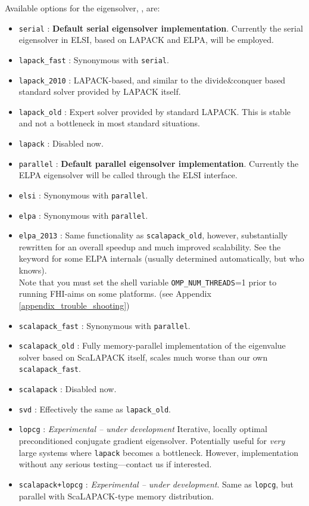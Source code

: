 Available options for the eigensolver, , are:
\begin{itemize}
  \item \texttt{serial} : \textbf{Default serial eigensolver implementation}.
    Currently the serial eigensolver in ELSI, based on LAPACK and ELPA, will be
    employed.
  \item \texttt{lapack\_fast} : Synonymous with \texttt{serial}.
  \item \texttt{lapack\_2010} : LAPACK-based, and similar to the divide\&conquer
    based standard solver provided by LAPACK itself.
  \item \texttt{lapack\_old} : Expert solver provided by standard LAPACK. This
    is stable and not a bottleneck in most standard situations.
  \item \texttt{lapack} : Disabled now.
  \item \texttt{parallel} : \textbf{Default parallel eigensolver
    implementation}. Currently the ELPA eigensolver will be called through the
    ELSI interface.
  \item \texttt{elsi} : Synonymous with \texttt{parallel}.
  \item \texttt{elpa} : Synonymous with \texttt{parallel}.
  \item \texttt{elpa\_2013} : Same functionality as \texttt{scalapack\_old},
    however, substantially rewritten for an overall speedup and much improved
    scalability. See the  keyword for some ELPA
    internals (usually determined automatically, but who knows). \\
    Note that you must set the shell variable \texttt{OMP\_NUM\_THREADS}=1
    prior to running FHI-aims on some platforms. (see Appendix
    \ref{appendix_trouble_shooting})
  \item \texttt{scalapack\_fast} : Synonymous with \texttt{parallel}.
  \item \texttt{scalapack\_old} : Fully memory-parallel implementation of the
    eigenvalue solver based on ScaLAPACK itself, scales much worse than our own
    \texttt{scalapack\_fast}.
  \item \texttt{scalapack} : Disabled now.
  \item \texttt{svd} : Effectively the same as \texttt{lapack\_old}.
  \item \texttt{lopcg} : \emph{Experimental -- under development} Iterative,
    locally optimal preconditioned conjugate gradient eigensolver. Potentially
    useful for \emph{very} large systems where \texttt{lapack} becomes a
    bottleneck. However, implementation without any serious testing---contact
    us if interested.
  \item \texttt{scalapack+lopcg} : \emph{Experimental -- under development}.
    Same as \texttt{lopcg}, but parallel with ScaLAPACK-type memory distribution.
\end{itemize}


